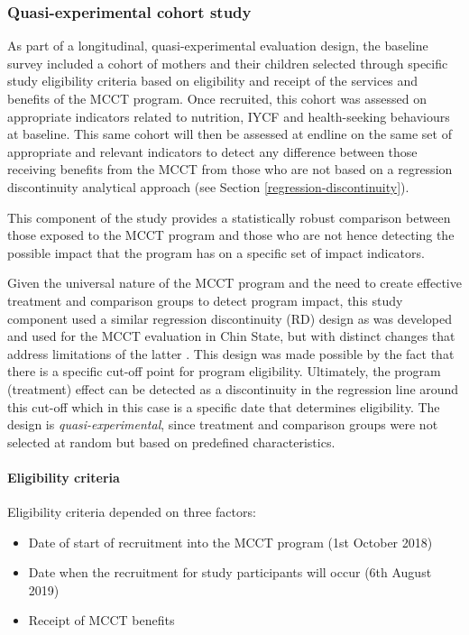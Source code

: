 \documentclass[12pt,a4paper]{article}
\let\oldparagraph\paragraph
\renewcommand{\paragraph}[1]{\oldparagraph{#1}\mbox{}}
\begin{document}
\hypertarget{study2}{%
\subsubsection{Quasi-experimental cohort study}\label{study2}}

As part of a longitudinal, quasi-experimental evaluation design, the baseline survey included a cohort of mothers and their children selected through specific study eligibility criteria based on eligibility and receipt of the services and benefits of the MCCT program. Once recruited, this cohort was assessed on appropriate indicators related to nutrition, IYCF and health-seeking behaviours at baseline. This same cohort will then be assessed at endline on the same set of appropriate and relevant indicators to detect any difference between those receiving benefits from the MCCT from those who are not based on a regression discontinuity analytical approach (see Section \ref{regression-discontinuity}).

This component of the study provides a statistically robust comparison between those exposed to the MCCT program and those who are not hence detecting the possible impact that the program has on a specific set of impact indicators.

Given the universal nature of the MCCT program and the need to create effective treatment and comparison groups to detect program impact, this study component used a similar regression discontinuity (RD) design as was developed and used for the MCCT evaluation in Chin State, but with distinct changes that address limitations of the latter \citep{MinistryofSocialWelfareReliefandResettlement2018}. This design was made possible by the fact that there is a specific cut-off point for program eligibility. Ultimately, the program (treatment) effect can be detected as a discontinuity in the regression line around this cut-off which in this case is a specific date that determines eligibility. The design is \emph{quasi-experimental}, since treatment and comparison groups were not selected at random but based on predefined characteristics.

\hypertarget{eligibility}{%
\paragraph{Eligibility criteria}\label{eligibility}}

Eligibility criteria depended on three factors:

\begin{itemize}
\item
  Date of start of recruitment into the MCCT program (1st October 2018)
\item
  Date when the recruitment for study participants will occur (6th August 2019)
\item
  Receipt of MCCT benefits
\end{itemize}
\end{document}
